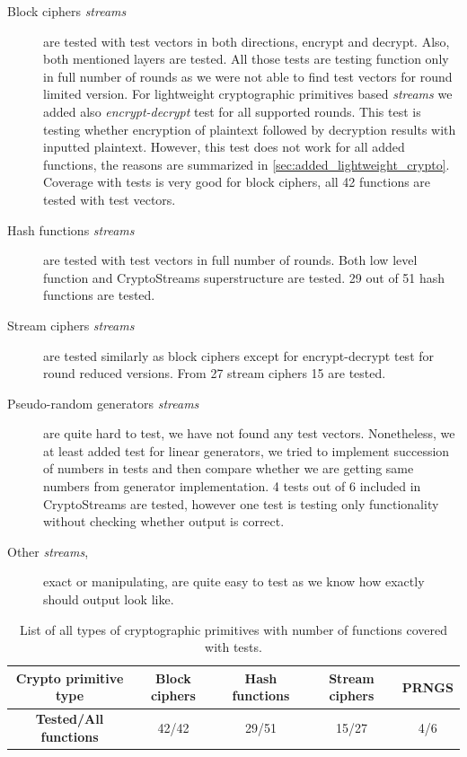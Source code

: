 \documentclass[
    digital,    %
    oneside,    %
    color,
    11pt,
    nocover,
    notable,
    nolof,
    nolot,
    final
]{fithesis3}
\begin{document}
\begin{description}
	\item[Block ciphers \textit{streams}] are tested with test vectors in both directions, encrypt and decrypt. Also, both mentioned layers are tested. All those tests are testing function only in full number of rounds as we were not able to find test vectors for round limited version. For lightweight cryptographic primitives based \textit{streams} we added also \textit{encrypt-decrypt} test for all supported rounds. This test is testing whether encryption of plaintext followed by decryption results with inputted plaintext. However, this test does not work for all added functions, the reasons are summarized in \cref{sec:added_lightweight_crypto}. Coverage with tests is very good for block ciphers, all 42 functions are tested with test vectors.
	
	\item[Hash functions \textit{streams}] are tested with test vectors in full number of rounds. Both low level function and CryptoStreams superstructure are tested. 29 out of 51 hash functions are tested.
	
	\item[Stream ciphers \textit{streams}] are tested similarly as block ciphers except for encrypt-decrypt test for round reduced versions. From 27 stream ciphers 15 are tested.
	
	\item[Pseudo-random generators \textit{streams}] are quite hard to test, we have not found any test vectors. Nonetheless, we at least added test for linear generators, we tried to implement succession of numbers in tests and then compare whether we are getting same numbers from generator implementation. 4 tests out of 6 included in CryptoStreams are tested, however one test is testing only functionality without checking whether output is correct. 
	
	\item[Other \textit{streams},] exact or manipulating, are quite easy to test as we know how exactly should output look like.
	 
\end{description}
\begin{table}[t]
	\centering	
	\begin{tabular}{c|c c c c}
		\textbf{\large Crypto primitive type} &  Block ciphers &  Hash functions &  Stream ciphers &  PRNGS  \\ \hline
		\textbf{\large Tested/All functions} & 42/42	&	29/51		&		15/27	&		4/6	\\
		
	\end{tabular}
	\caption{List of all types of cryptographic primitives with number of functions covered with tests.}
	\label{table:tested-cryptoprimitives}
\end{table}
\end{document}
